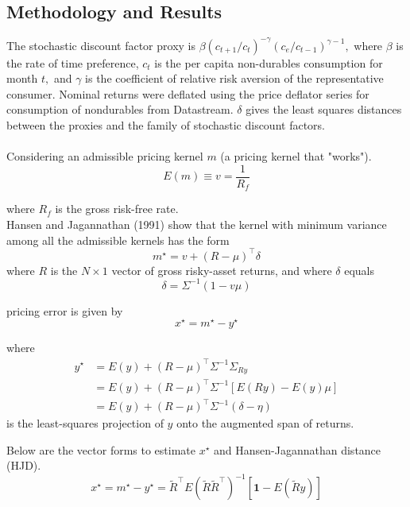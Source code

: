 \documentclass[11pt]{article}
\begin{document}
 \subsection{Methodology and Results}
 
 The stochastic discount factor proxy is $\beta\left(c_{t+1} / c_{t}\right)^{-\gamma}\left(c_{e} / c_{t-1}\right)^{\gamma-1},$ where $\beta$ is the rate of time preference, $c_{t}$ is the per capita non-durables consumption for month $t,$ and $\gamma$ is the coefficient of relative risk aversion of the representative consumer. Nominal returns
were deflated using the price deflator series for consumption of nondurables
from Datastream. $\delta$ gives the least squares distances between the proxies and the family of stochastic discount factors.

 \paragraph{} Considering an admissible pricing kernel $m$ (a pricing kernel that "works"). 
\begin{equation}
E(m) \equiv v=\frac{1}{R_{f}}
\end{equation}

where $R_{f}$ is the gross risk-free rate.\\
Hansen and Jagannathan (1991) show that the kernel with minimum variance among all the admissible kernels has the form
\begin{equation}
m^{\star}=v+(R-\mu)^{\top} \delta
\end{equation}
where $R$ is the $N \times 1$ vector of gross risky-asset returns, and where $\delta$ equals
\begin{equation}
\delta=\Sigma^{-1}(1-v \mu)
\end{equation}
 
pricing error is given by
\begin{equation}
x^{\star}=m^{\star}-y^{\star}
\end{equation}

where
$$
\begin{aligned}
y^{\star} &=E(y)+(R-\mu)^{\top} \Sigma^{-1} \Sigma_{R y} \\
&=E(y)+(R-\mu)^{\top} \Sigma^{-1}[E(R y)-E(y) \mu] \\
&=E(y)+(R-\mu)^{\top} \Sigma^{-1}(\delta-\eta)
\end{aligned}
$$
is the least-squares projection of $y$ onto the augmented span of returns.

Below are the vector forms to estimate $x^{\star}$ and Hansen-Jagannathan distance (HJD).
\begin{equation}
x^{\star}=m^{\star}-y^{\star}=\tilde{R}^{\top} E\left(\tilde{R} \tilde{R}^{\top}\right)^{-1}[\mathbf{1}-E(\tilde{R} y)]
\end{equation}
\end{document}

